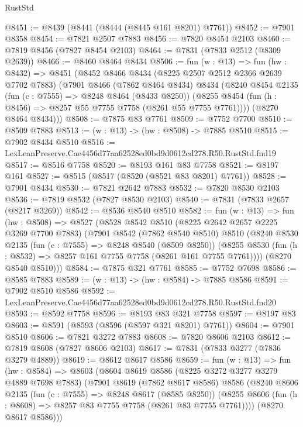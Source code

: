 \begin{lexlean}{RustStd}
\begin{coremodule}
@8451 := @8439 (@8441 (@8444 (@8445 @161 @8201) @7761))
@8452 := @7901 @8358
@8454 := @7821 @2507 @7883
@8456 := @7820 @8454 @2103
@8460 := @7819 @8456 (@7827 @8454 @2103)
@8464 := @7831 (@7833 @2512 (@8309 @2639))
@8466 := @8460 @8464 @8434
@8506 := fun (w : @13) =>
  fun (hw : @8432) =>
  @8451
    (@8452
      @8466
      @8434
      (@8225 @2507 @2512 @2366 @2639 @7702 @7883)
      (@7901
        @8466
        (@7862 @8464 @8434)
        @8434
        (@8240
          @8454
          @2135
          (fun (c : @7555) => @8248 @8464 (@8433 @8250))
          (@8255 @8454 (fun (h : @8456) => @8257 @55 @7755 @7758 (@8261 @55 @7755 @7761))))
        (@8270 @8464 @8434)))
@8508 := @7875 @83 @7761
@8509 := @7752 @7700
@8510 := @8509 @7883
@8513 := (w : @13) -> (hw : @8508) -> @7885 @8510
@8515 := @7902 @8434 @8510
@8516 := LexLeanPreserve.Cae4456d77aa62528ed0bd9d0612cd278.R50.RustStd.fnd19
@8517 := @8516 @7758
@8520 := @8193 @161 @83 @7758
@8521 := @8197 @161
@8527 := @8515 (@8517 (@8520 (@8521 @83 @8201) @7761))
@8528 := @7901 @8434
@8530 := @7821 @2642 @7883
@8532 := @7820 @8530 @2103
@8536 := @7819 @8532 (@7827 @8530 @2103)
@8540 := @7831 (@7833 @2657 (@8217 @3269))
@8542 := @8536 @8540 @8510
@8582 := fun (w : @13) =>
  fun (hw : @8508) =>
  @8527
    (@8528
      @8542
      @8510
      (@8225 @2642 @2657 @2225 @3269 @7700 @7883)
      (@7901
        @8542
        (@7862 @8540 @8510)
        @8510
        (@8240
          @8530
          @2135
          (fun (c : @7555) => @8248 @8540 (@8509 @8250))
          (@8255 @8530 (fun (h : @8532) => @8257 @161 @7755 @7758 (@8261 @161 @7755 @7761))))
        (@8270 @8540 @8510)))
@8584 := @7875 @321 @7761
@8585 := @7752 @7698
@8586 := @8585 @7883
@8589 := (w : @13) -> (hw : @8584) -> @7885 @8586
@8591 := @7902 @8510 @8586
@8592 := LexLeanPreserve.Cae4456d77aa62528ed0bd9d0612cd278.R50.RustStd.fnd20
@8593 := @8592 @7758
@8596 := @8193 @83 @321 @7758
@8597 := @8197 @83
@8603 := @8591 (@8593 (@8596 (@8597 @321 @8201) @7761))
@8604 := @7901 @8510
@8606 := @7821 @3272 @7883
@8608 := @7820 @8606 @2103
@8612 := @7819 @8608 (@7827 @8606 @2103)
@8617 := @7831 (@7833 @3277 (@7836 @3279 @4889))
@8619 := @8612 @8617 @8586
@8659 := fun (w : @13) =>
  fun (hw : @8584) =>
  @8603
    (@8604
      @8619
      @8586
      (@8225 @3272 @3277 @3279 @4889 @7698 @7883)
      (@7901
        @8619
        (@7862 @8617 @8586)
        @8586
        (@8240
          @8606
          @2135
          (fun (c : @7555) => @8248 @8617 (@8585 @8250))
          (@8255 @8606 (fun (h : @8608) => @8257 @83 @7755 @7758 (@8261 @83 @7755 @7761))))
        (@8270 @8617 @8586)))

\end{coremodule}
\end{lexlean}
